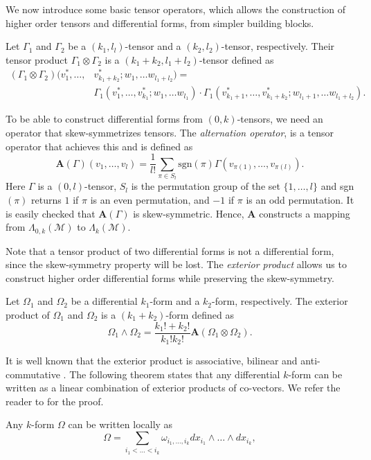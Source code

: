 We now introduce some basic tensor operators, which allows the construction of higher order tensors and differential forms, from simpler building blocks.
\begin{definition}
	Let $\Gamma_1$ and $\Gamma_2$ be a $(k_1,l_l)$-tensor and a $(k_2,l_2)$-tensor, respectively. Their tensor product $\Gamma_1\otimes \Gamma_2$ is a $(k_1+k_2,l_1+l_2)$-tensor defined as
\[
	\begin{aligned}
	(\Gamma_1\otimes \Gamma_2)(v^*_1,\dots,&v^*_{k_1+k_2};w_1,\dots w_{l_1+l_2}) = \\
		&\Gamma_1(v^*_1,\dots,v^*_{k_1};w_1,\dots w_{l_1})\cdot \Gamma_1(v^*_{k_1+1},\dots,v^*_{k_1+k_2};w_{l_1+1},\dots w_{l_1+l_2}).
	\end{aligned}
\]
\end{definition}
To be able to construct differential forms from $(0,k)$-tensors, we need an operator that skew-symmetrizes tensors. The \emph{alternation operator}, is a tensor operator that achieves this and is defined as
\begin{equation} \label{eq:2.7}
	\textbf{A}(\Gamma)(v_1,\dots,v_l) = \frac{1}{l!} \sum_{\pi \in S_l} \text{sgn}(\pi) \Gamma(v_{\pi(1)},\dots,v_{\pi(l)}).
\end{equation}
Here $\Gamma$ is a $(0,l)$-tensor, $S_l$ is the permutation group of the set $\{1,\dots,l\}$ and sgn$(\pi)$ returns $1$ if $\pi$ is an even permutation, and $-1$ if $\pi$ is an odd permutation. It is easily checked that $\textbf{A}(\Gamma)$ is skew-symmetric. Hence, $\textbf{A}$ constructs a mapping from $\Lambda_{0,k}(\mathcal M)$ to $\Lambda_{k}(\mathcal M)$.

Note that a tensor product of two differential forms is not a differential form, since the skew-symmetry property will be lost. The \emph{exterior product} allows us to construct higher order differential forms while preserving the skew-symmetry. 
\begin{definition}
Let $\Omega_1$ and $\Omega_2$ be a differential $k_1$-form and a $k_2$-form, respectively. The exterior product of $\Omega_1$ and $\Omega_2$ is a $(k_1+k_2)$-form defined as
\begin{equation} \label{eq:2.8}
	\Omega_1 \wedge \Omega_2 = \frac{k_1! + k_2!}{k_1!k_2!} \mathbf{A}(\Omega_1\otimes \Omega_2).
\end{equation}
\end{definition}
It is well known that the exterior product is associative, bilinear and anti-commutative \cite{marsden2013introduction}. The following theorem states that any differential $k$-form can be written as a linear combination of exterior products of co-vectors. We refer the reader to \cite{abraham1978foundations} for the proof.
\begin{theorem} \label{theorem:2.2}
Any $k$-form $\Omega$ can be written locally as
\begin{equation} \label{eq:2.9}
	\Omega = \sum_{i_1<\dots<i_k} \omega_{i_1,\dots,i_k} dx_{i_1}\wedge\dots\wedge dx_{i_k},
\end{equation}
\end{theorem}

